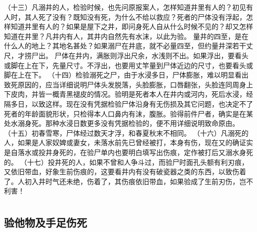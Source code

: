 \documentclass[12pt,UTF8]{ctexbook}
\begin{document}
（十三）凡溺井的人，检验时候，也先问原报案人，怎样知道井里有人的？初见有人时，其人死了没有？既知没有死，为什么不给以救应？死者的尸体没有浮起，怎样知道井里有人的？如果是屋下之井，即问身死人自从什么时候不见的？却又怎样知道在井里？凡井内有人，其井内自然先有水沫，以此为验。
量井的四至，是在什么人的地上？其地名甚处？如果溺尸在井底，就不必量四至，但约量井深若干丈尺，才捞尸出。
尸体在井内，满胀则浮出尺余，水浅则不出。如果浮出，要看头或脚在上在下，先量尺寸。不浮出，也要用丈竿量到尸体近边的尺寸，也要看头或脚在上在下。
（十四）检验溺死之尸，由于水浸多日，尸体膨胀，难以明显看出致死原因的，应当详细说明尸体头发脱落，头脸膨胀，口唇翻张，头脸连同周身上下皮肉，并皆一概青黑褪皮的情况。验明是死者本人在井内或河内，死后水浸，经隔多日，以致这样。现在没有凭据检验尸体沿身有无伤损及其它问题，也决定不了死者的年龄面貌形状，只检得本人口鼻内有沫，腹胀。验得前件尸者，确实是在某处水溺身死。那种水浸日数更多没有凭据检验的，便不用详细说明致命原由。
（十五）初春雪寒，尸体经过数天才浮，和春夏秋末不相同。
（十六）凡溺死的人，如果是人家奴婢或妻女，未落水前先已曾经被打，本身有伤，现在又的确证实是自落水或投井身死的，在验尸单内也要明白填写出伤痕，定作被打后又溺水身死的。
（十七）投井死的人，如果不曾和人争斗过，而验尸时面孔头额有利刃痕，又依旧带血，好象生前伤痕的，这要看井内有没有破瓷器之类的东西，以致伤着了。人初入井时气还未绝，伤着了，其伤痕依旧带血，如果验成了生前刃伤，岂不利害！


\part{}

\chapter{验他物及手足伤死}
\end{document}
